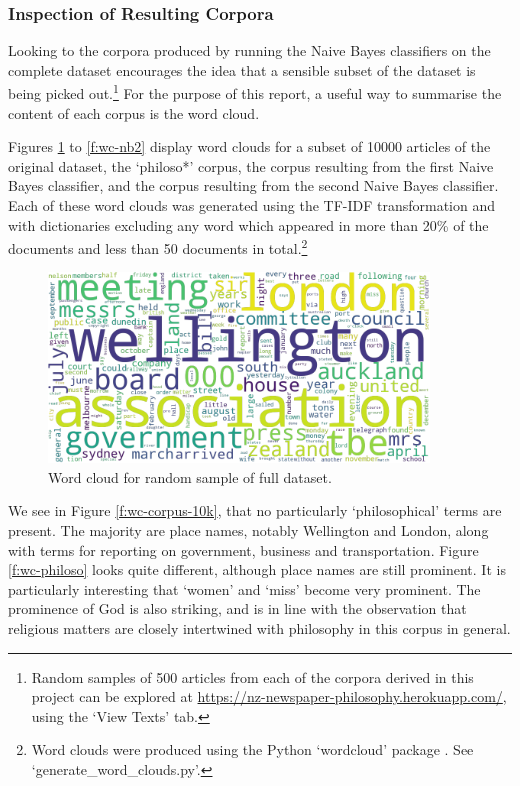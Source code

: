 \documentclass{article}
\begin{document}
\subsubsection{Inspection of Resulting Corpora}

Looking to the corpora produced by running the Naive Bayes classifiers on the complete dataset encourages the idea that a sensible subset of the dataset is being picked out.\footnote{Random samples of 500 articles from each of the corpora derived in this project can be explored at \url{https://nz-newspaper-philosophy.herokuapp.com/}, using the `View Texts' tab.} For the purpose of this report, a useful way to summarise the content of each corpus is the word cloud.

Figures \ref{f:wc-corpus_10k} to \ref{f:wc-nb2} display word clouds for a subset of 10000 articles of the original dataset, the `philoso*' corpus, the corpus resulting from the first Naive Bayes classifier, and the corpus resulting from the second Naive Bayes classifier. Each of these word clouds was generated using the TF-IDF transformation and with dictionaries excluding any word which appeared in more than 20\% of the documents and less than 50 documents in total.\footnote{Word clouds were produced using the Python `wordcloud' package \cite{wordcloud}. See `generate\_\-word\_\-clouds.py'.}

\begin{figure}
  \centering
  \includegraphics[width=0.9\textwidth]{images/corpus_10000_subset_tf-idf.png}
  \caption{Word cloud for random sample of full dataset.}
  \label{f:wc-corpus_10k}
\end{figure}

We see in Figure \ref{f:wc-corpus-10k}, that no particularly `philosophical' terms are present. The majority are place names, notably Wellington and London, along with terms for reporting on government, business and transportation. Figure \ref{f:wc-philoso} looks quite different, although place names are still prominent. It is particularly interesting that `women' and `miss' become very prominent. The prominence of God is also striking, and is in line with the observation that religious matters are closely intertwined with philosophy in this corpus in general.
\end{document}
